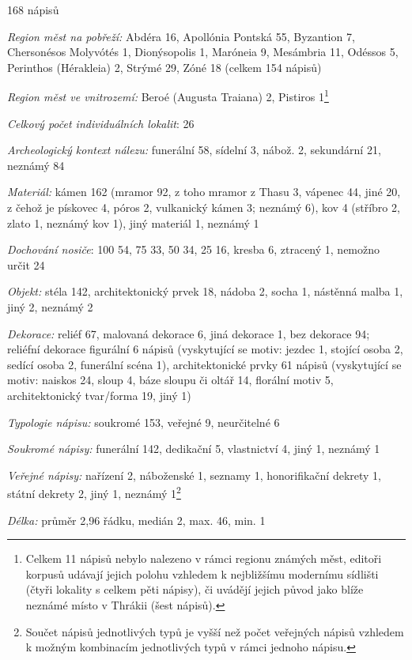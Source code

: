 \placetable[none]{}
\starttable[|l|]
\HL
{} 168 nápisů

{\em Region měst na pobřeží:} Abdéra 16, Apollónia Pontská 55, Byzantion 7, Chersonésos Molyvótés 1, Dionýsopolis 1, Maróneia 9, Mesámbria 11, Odéssos 5, Perinthos (Hérakleia) 2, Strýmé 29, Zóné 18 (celkem 154 nápisů)

{\em Region měst ve vnitrozemí:} Beroé (Augusta Traiana) 2, Pistiros 1\footnote{Celkem 11 nápisů nebylo nalezeno v rámci regionu známých měst, editoři korpusů udávají jejich polohu vzhledem k nejbližšímu modernímu sídlišti (čtyři lokality s celkem pěti nápisy), či uvádějí jejich původ jako blíže neznámé místo v Thrákii (šest nápisů).}

{\em Celkový počet individuálních lokalit}: 26

{\em Archeologický kontext nálezu:} funerální 58, sídelní 3, nábož. 2, sekundární 21, neznámý 84

{\em Materiál:} kámen 162 (mramor 92, z toho mramor z Thasu 3, vápenec 44, jiné 20, z čehož je pískovec 4, póros 2, vulkanický kámen 3; neznámý 6), kov 4 (stříbro 2, zlato 1, neznámý kov 1), jiný materiál 1, neznámý 1

{\em Dochování nosiče}: 100  54, 75  33, 50  34, 25  16, kresba 6, ztracený 1, nemožno určit 24

{\em Objekt:} stéla 142, architektonický prvek 18, nádoba 2, socha 1, nástěnná malba 1, jiný 2, neznámý 2

{\em Dekorace:} reliéf 67, malovaná dekorace 6, jiná dekorace 1, bez dekorace 94; reliéfní dekorace figurální 6 nápisů (vyskytující se motiv: jezdec 1, stojící osoba 2, sedící osoba 2, funerální scéna 1), architektonické prvky 61 nápisů (vyskytující se motiv: naiskos 24, sloup 4, báze sloupu či oltář 14, florální motiv 5, architektonický tvar/forma 19, jiný 1)

{\em Typologie nápisu:} soukromé 153, veřejné 9, neurčitelné 6

{\em Soukromé nápisy:} funerální 142, dedikační 5, vlastnictví 4, jiný 1, neznámý 1

{\em Veřejné nápisy:} nařízení 2, náboženské 1, seznamy 1, honorifikační dekrety 1, státní dekrety 2, jiný 1, neznámý 1\footnote{Součet nápisů jednotlivých typů je vyšší než počet veřejných nápisů vzhledem k možným kombinacím jednotlivých typů v rámci jednoho nápisu.}

{\em Délka:} průměr 2,96 řádku, medián 2, max. 46, min. 1

